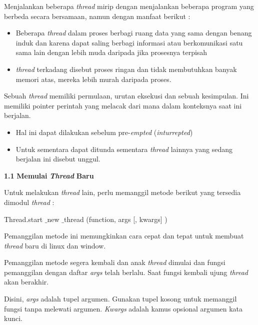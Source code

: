 Menjalankan beberapa\textit{ thread} mirip dengan menjalankan beberapa program yang berbeda secara bersamaan, namun dengan manfaat berikut : \par
\begin{itemize}
	\item Beberapa \textit{thread} dalam proses berbagi ruang data yang sama dengan benang induk dan karena dapat saling berbagi informasi atau berkomunikasi satu sama lain dengan lebih muda daripada jika prosesnya terpisah \par
	\item \textit{thread} terkadang disebut proses ringan dan tidak membutuhkan banyak memori atas, mereka lebih murah daripada proses.\end{itemize}
\par
Sebuah \textit{thread} memiliki permulaan, urutan eksekusi dan sebuah kesimpulan. Ini memiliki pointer perintah yang melacak dari mana dalam konteksnya saat ini berjalan. \par
\begin{itemize}
	\item Hal ini dapat dilakukan sebelum pre-\textit{empted} (\textit{inturrepted})\end{itemize}
\par
\noindent 
\begin{itemize}
	\item Untuk sementara dapat ditunda sementara \textit{thread} lainnya yang sedang berjalan ini disebut unggul. \end{itemize}
\par
\noindent 
\textbf{1.}\textbf{1 }\textbf{Memulai }\textbf{\textit{Thread}}\textbf{ Baru} \par
\noindent 
\hspace*{0.5in} Untuk melakukan \textit{thread} lain, perlu memanggil metode berikut yang tersedia dimodul \textit{thread} : \par
\noindent 
\begin{center}{\fontsize{9pt}{9pt}\selectfont Thread.start $  \_  $new $  \_  $thread (function, args [, kwargs] )}\end{center} \par
Pemanggilan metode ini memungkinkan cara cepat dan tepat untuk membuat \textit{thread} baru di linux dan window. \par
Pemanggilan metode segera kembali dan anak  \textit{thread} dimulai dan fungsi pemanggilan dengan daftar \textit{args} telah berlalu. Saat fungsi kembali ujung \textit{thread} akan berakhir.   \par
Disini, \textit{args }adalah tupel argumen. Gunakan tupel kosong untuk memanggil fungsi tanpa melewati argumen. \textit{Kwargs} adalah kamus opsional argumen kata kunci.  \par
\noindent 
\par
\noindent 


